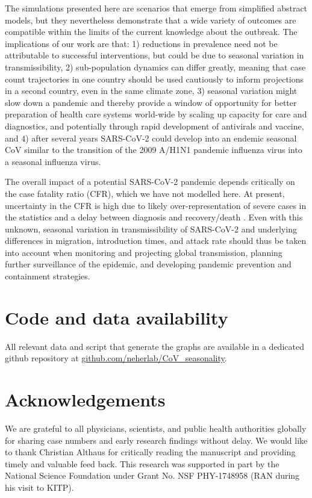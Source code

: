 \documentclass[rmp, reprint, superscriptaddress, floatfix,amsmath]{revtex4-1}
\begin{document}
The simulations presented here are scenarios that emerge from simplified abstract models, but they nevertheless demonstrate that a wide variety of outcomes are compatible within the limits of the current knowledge about the outbreak. 
The implications of our work are that: 1) reductions in prevalence need not be attributable to successful interventions, but could be due to seasonal variation in transmissibility, 2) sub-population dynamics can differ greatly, meaning that case count trajectories in one country should be used cautiously to inform projections in a second country, even in the same climate zone, 3) seasonal variation might slow down a pandemic and thereby provide a window of opportunity for better preparation of health care systems world-wide by scaling up capacity for care and diagnostics, and potentially through rapid development of antivirals and vaccine, and 4) after several years SARS-CoV-2 could develop into an endemic seasonal CoV similar to the transition of the 2009 A/H1N1 pandemic influenza virus into a seasonal influenza virus.

The overall impact of a potential SARS-CoV-2 pandemic depends critically on the case fatality ratio (CFR), which we have not modelled here. 
At present, uncertainty in the CFR is high due to likely over-representation of severe cases in the statistics and a delay between diagnosis and recovery/death  \citep{battegay_2019-novel_2020}. 
Even with this unknown, seasonal variation in transmissibility of SARS-CoV-2 and underlying differences in migration, introduction times, and attack rate should thus be taken into account when monitoring and projecting global transmission, planning further surveillance of the epidemic, and developing pandemic prevention and containment strategies.

\section{Code and data availability}
All relevant data and script that generate the graphs are available in a dedicated github repository at \url{github.com/neherlab/CoV_seasonality}.

\section*{Acknowledgements}
We are grateful to all physicians, scientists, and public health authorities globally for sharing case numbers and early research findings without delay. 
We would like to thank Christian Althaus for critically reading the manuscript and providing timely and valuable feed back. 
This research was supported in part by the National Science Foundation under Grant No. NSF PHY-1748958 (RAN during his visit to KITP).
\end{document}
